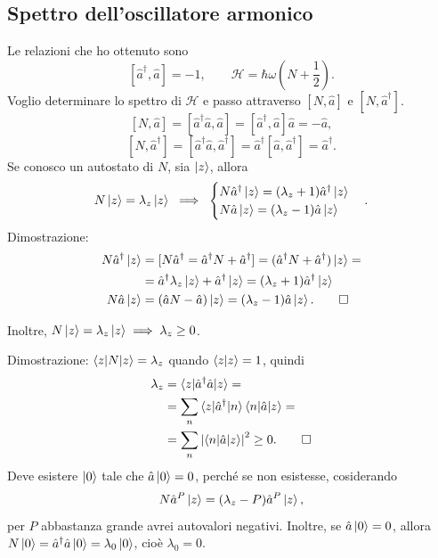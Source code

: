 \subsection{Spettro dell'oscillatore armonico}
Le relazioni che ho ottenuto sono 
\[
[\hat{a}^\dag, \hat{a}] = -1, \qquad \mathcal{H} = \hbar \omega \left( N + \frac{1}{2} \right).
\]
Voglio determinare lo spettro di \( \mathcal{H} \) e passo attraverso \( [N, \hat{a}] \) e \( [N, \hat{a}^\dag] \).
\[
[N, \hat{a}] = [\hat{a}^\dag \hat{a}, \hat{a}] = [\hat{a}^\dag, \hat{a}]\hat{a} = -\hat{a},
\]
\[
[N, \hat{a}^\dag] = [\hat{a}^\dag \hat{a}, \hat{a}^\dag] = \hat{a}^\dag[\hat{a}, \hat{a}^\dag] = \hat{a}^\dag.
\]
Se conosco un autostato di \( N \), sia \( \ket{z} \), allora
\[
N \ket{z} = \lambda_z \ket{z} \; \implies \; \begin{cases}
N \hat{a}^\dag \ket{z} = (\lambda_z + 1) \hat{a}^\dag \ket{z} \\
N \hat{a} \ket{z} = (\lambda_z - 1) \hat{a} \ket{z}
\end{cases}.
\]
Dimostrazione:
\begin{align*}
N \hat{a}^\dag \ket{z} &= [N \hat{a}^\dag = \hat{a}^\dag N + \hat{a}^\dag] = (\hat{a}^\dag N + \hat{a}^\dag) \ket{z} = \\
&= \hat{a}^\dag \lambda_z \ket{z} + \hat{a}^\dag \ket{z} = (\lambda_z + 1) \hat{a}^\dag \ket{z} \\
N \hat{a} \ket{z} &= (\hat{a}N - \hat{a}) \ket{z} = (\lambda_z - 1) \hat{a} \ket{z}. \qed
\end{align*}

\bigskip
\noindent
Inoltre, \( N \ket{z} = \lambda_z \ket{z} \implies \lambda_z \geq 0 \).

\bigskip
\noindent
Dimostrazione: \( \braket{z|N|z} = \lambda_z \) quando \( \braket{z|z} = 1 \), quindi
\begin{align*}
\lambda_z &= \braket{z|\hat{a}^\dag \hat{a}|z} = \\
&= \sum_n \braket{z|\hat{a}^\dag|n} \braket{n|\hat{a}|z} = \\
&= \sum_n \left| \braket{n|\hat{a}|z} \right|^2 \geq 0. \qed
\end{align*}
Deve esistere \( \ket{0} \) tale che \( \hat{a} \ket{0} = 0 \), perché se non esistesse, cosiderando
\[
N \hat{a}^P \ket{z} = (\lambda_z - P) \hat{a}^P \ket{z},
\]
per \( P \) abbastanza grande avrei autovalori negativi. Inoltre, se \( \hat{a} \ket{0} = 0 \), allora \( N \ket{0} = \hat{a}^\dag \hat{a} \ket{0} = \lambda_0 \ket{0} \), cioè \( \lambda_0 = 0 \).

